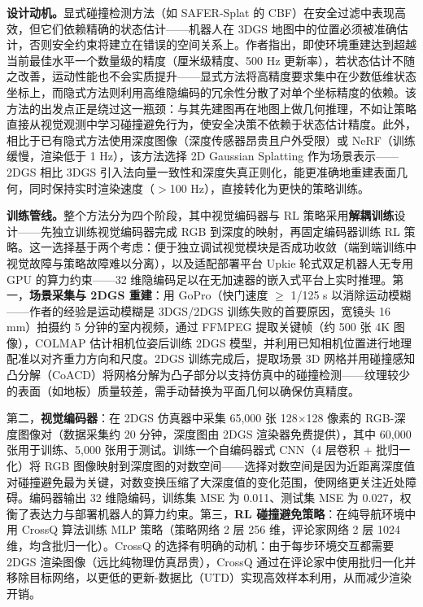 \textbf{设计动机。}显式碰撞检测方法（如 SAFER-Splat 的 CBF）在安全过滤中表现高效，但它们依赖精确的状态估计——机器人在 3DGS 地图中的位置必须被准确估计，否则安全约束将建立在错误的空间关系上。作者指出，即使环境重建达到超越当前最佳水平一个数量级的精度（厘米级精度、500 Hz 更新率），若状态估计不随之改善，运动性能也不会实质提升——显式方法将高精度要求集中在少数低维状态坐标上，而隐式方法则利用高维隐编码的冗余性分散了对单个坐标精度的依赖。该方法的出发点正是绕过这一瓶颈：与其先建图再在地图上做几何推理，不如让策略直接从视觉观测中学习碰撞避免行为，使安全决策不依赖于状态估计精度。此外，相比于已有隐式方法使用深度图像（深度传感器昂贵且户外受限）或 NeRF（训练缓慢，渲染低于 1 Hz），该方法选择 2D Gaussian Splatting 作为场景表示——2DGS 相比 3DGS 引入法向量一致性和深度失真正则化，能更准确地重建表面几何，同时保持实时渲染速度（$>$100 Hz），直接转化为更快的策略训练。

\textbf{训练管线。}整个方法分为四个阶段，其中视觉编码器与 RL 策略采用\textbf{解耦训练}设计——先独立训练视觉编码器完成 RGB 到深度的映射，再固定编码器训练 RL 策略。这一选择基于两个考虑：便于独立调试视觉模块是否成功收敛（端到端训练中视觉故障与策略故障难以分离），以及适配部署平台 Upkie 轮式双足机器人无专用 GPU 的算力约束——32 维隐编码足以在无加速器的嵌入式平台上实时推理。第一，\textbf{场景采集与 2DGS 重建}：用 GoPro（快门速度 $\geq$ 1/125 s 以消除运动模糊——作者的经验是运动模糊是 3DGS/2DGS 训练失败的首要原因，宽镜头 16 mm）拍摄约 5 分钟的室内视频，通过 FFMPEG 提取关键帧（约 500 张 4K 图像），COLMAP 估计相机位姿后训练 2DGS 模型，并利用已知相机位置进行地理配准以对齐重力方向和尺度。2DGS 训练完成后，提取场景 3D 网格并用碰撞感知凸分解（CoACD）将网格分解为凸子部分以支持仿真中的碰撞检测——纹理较少的表面（如地板）质量较差，需手动替换为平面几何以确保仿真精度。

第二，\textbf{视觉编码器}：在 2DGS 仿真器中采集 65,000 张 128$\times$128 像素的 RGB-深度图像对（数据采集约 20 分钟，深度图由 2DGS 渲染器免费提供），其中 60,000 张用于训练、5,000 张用于测试。训练一个自编码器式 CNN（4 层卷积 + 批归一化）将 RGB 图像映射到深度图的对数空间——选择对数空间是因为近距离深度值对碰撞避免最为关键，对数变换压缩了大深度值的变化范围，使网络更关注近处障碍。编码器输出 32 维隐编码，训练集 MSE 为 0.011、测试集 MSE 为 0.027，权衡了表达力与部署机器人的算力约束。第三，\textbf{RL 碰撞避免策略}：在纯导航环境中用 CrossQ 算法训练 MLP 策略（策略网络 2 层 256 维，评论家网络 2 层 1024 维，均含批归一化）。CrossQ 的选择有明确的动机：由于每步环境交互都需要 2DGS 渲染图像（远比纯物理仿真昂贵），CrossQ 通过在评论家中使用批归一化并移除目标网络，以更低的更新-数据比（UTD）实现高效样本利用，从而减少渲染开销。

